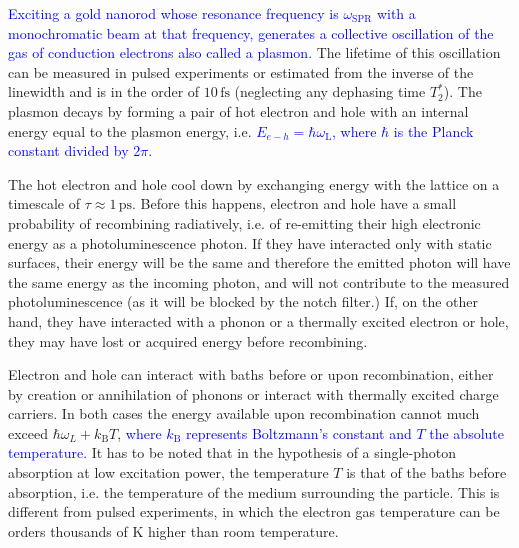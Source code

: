 \documentclass[journal=nalefd,manuscript=letter]{achemso}
\newcommand{\HI}[1]{\textcolor{blue}{#1}} %
\newcommand{\fs}{\ensuremath{\,\textrm{fs}}}
\newcommand{\ps}{\ensuremath{\,\textrm{ps}}}
\begin{document}
\HI{Exciting a gold nanorod whose resonance frequency is $\omega_\textrm{SPR}$ with a monochromatic beam at that frequency, generates a collective oscillation of the gas of conduction
electrons also called a plasmon.} The lifetime of this oscillation can be measured in
pulsed experiments or estimated from the inverse of the linewidth and is in the
order of $10\fs$\cite{Sonnichsen2002} (neglecting any dephasing time $T_2^*$).
The plasmon decays by forming a pair of hot electron and hole with an internal energy equal to the plasmon
energy\cite{Sundararaman2014,Brongersma2015,AlejandroManjavacasJunG.LiuVikramKulkarni2014}, i.e. \HI{
$E_{e-h}=\hbar \omega_\textrm{L}$, where $\hbar$ is the Planck constant divided by $2\pi$.}

The hot electron and hole cool down by exchanging energy with the lattice on a
timescale of $\tau\approx1\ps$\cite{Pustovalov2005}. Before this happens,
electron and hole have a small probability of recombining radiatively, i.e. of 
re-emitting their high electronic energy as a photoluminescence photon. If they
have interacted only with static surfaces, their energy will be the same and
therefore the emitted photon will have the same energy as the incoming
photon, and will not contribute to the measured photoluminescence (as it will be
blocked by the notch filter.) If, on the other hand, they have interacted with a
phonon or a thermally excited electron or hole, they may have lost or acquired
energy before recombining.

Electron and hole can interact with baths before or upon recombination, either by
creation or annihilation of phonons or interact with thermally excited charge
carriers. In both cases the energy available upon
recombination cannot much exceed $\hbar\omega_L+k_\textrm{B}T$, \HI{where $k_\textrm{B}$ 
represents Boltzmann's constant and $T$ the absolute temperature.} 
It has to be noted that in the hypothesis of a single-photon absorption at low 
excitation power, the temperature $T$ is that of the baths before absorption, i.e. the temperature of
the medium surrounding the particle. This is different from pulsed experiments,
in which the electron gas temperature can be orders thousands of K higher than
room temperature\cite{Baffou2013a}. 
\end{document}
